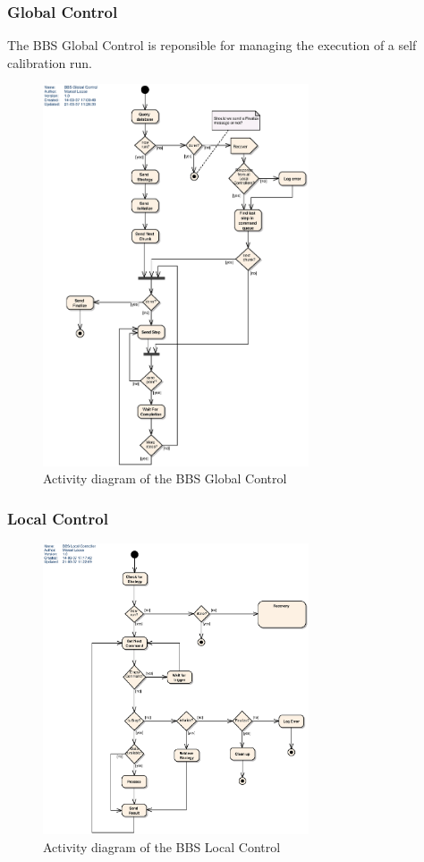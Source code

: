 \documentclass[10pt]{lofar}
\begin{document}
\subsubsection{Global Control}
\label{subsubsec:design-global-control}
The BBS Global Control is reponsible for managing the execution of a self
calibration run.
\begin{figure}[!ht]
\centering
\includegraphics[width=0.7\textwidth]{images/bbs-global-control-activity-diagram}
\caption{Activity diagram of the BBS Global Control}
\label{fig:global-control-activity}
\end{figure}

\subsubsection{Local Control}
\label{subsubsec:design-local-control}
\begin{figure}[!ht]
\centering
\includegraphics[width=0.7\textwidth]{images/bbs-local-control-activity-diagram}
\caption{Activity diagram of the BBS Local Control}
\label{fig:local-control-activity}
\end{figure}
\end{document}
